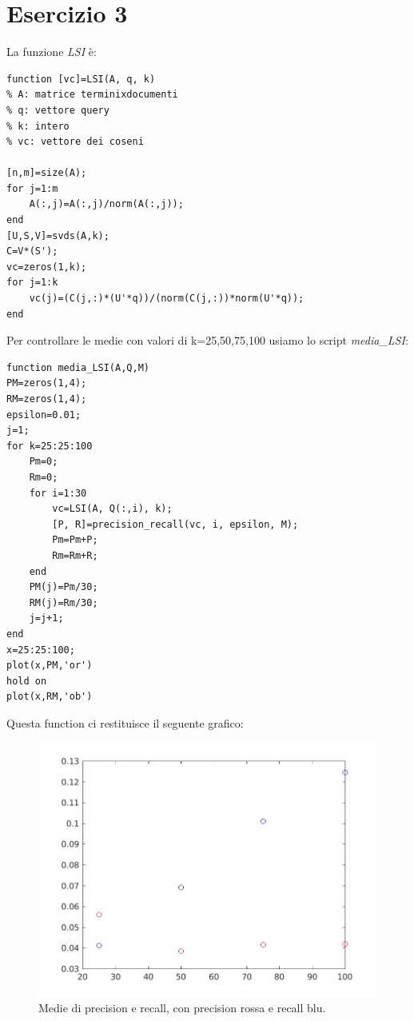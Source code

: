 \documentclass[11pt,a4paper,twoside,openright,titlepage,
                           headinclude,footinclude,BCOR5mm,
                           numbers=noenddot,cleardoublepage=empty,
                           tablecaptionabove]{scrbook}
\begin{document}
\section{Esercizio 3}
La funzione \emph{LSI} è:
\begin{lstlisting}[frame=trBL]
function [vc]=LSI(A, q, k)
% A: matrice terminixdocumenti
% q: vettore query
% k: intero
% vc: vettore dei coseni

[n,m]=size(A);
for j=1:m
    A(:,j)=A(:,j)/norm(A(:,j));
end
[U,S,V]=svds(A,k);
C=V*(S');
vc=zeros(1,k);
for j=1:k
    vc(j)=(C(j,:)*(U'*q))/(norm(C(j,:))*norm(U'*q));
end
\end{lstlisting}
Per controllare le medie con valori di k=25,50,75,100 usiamo lo script \emph{media\_LSI}:
\begin{lstlisting}[frame=trBL]
function media_LSI(A,Q,M)
PM=zeros(1,4);
RM=zeros(1,4);
epsilon=0.01;
j=1;
for k=25:25:100
    Pm=0;
    Rm=0;
    for i=1:30
        vc=LSI(A, Q(:,i), k);
        [P, R]=precision_recall(vc, i, epsilon, M);
        Pm=Pm+P;
        Rm=Rm+R;
    end
    PM(j)=Pm/30;
    RM(j)=Rm/30;
    j=j+1;
end
x=25:25:100;
plot(x,PM,'or')
hold on
plot(x,RM,'ob')
\end{lstlisting}
Questa function ci restituisce il seguente grafico:
\begin{figure}[h!]
\begin{center}
\includegraphics[width=\textwidth]{figs/media_LSI.jpg}
\caption{Medie di precision e recall, con precision rossa e recall blu.}
\end{center}
\end{figure}
\end{document}
